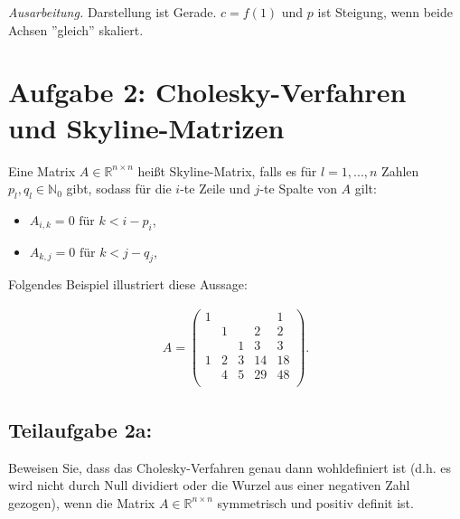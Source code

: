 \documentclass[]{article}
\newenvironment{ausarbeitung}{\vspace{3mm}\noindent\textit{Ausarbeitung.}}{}
\begin{document}
\begin{ausarbeitung}
	Darstellung ist Gerade. $c = f(1)$ und $p$ ist Steigung, wenn beide Achsen ''gleich'' skaliert.
\end{ausarbeitung}
\newpage



\section*{Aufgabe 2: Cholesky-Verfahren und Skyline-Matrizen}
Eine Matrix $A \in \mathbb{R}^{n\times n}$ heißt Skyline-Matrix, falls es für $l = 1, ..., n$ Zahlen $p_l, q_l \in \mathbb{N}_0$ gibt, sodass für die $i$-te Zeile und $j$-te Spalte von $A$ gilt:

\begin{itemize}
	\item $A_{i,k} = 0 \text{ für } k < i - p_i$,
	\item $A_{k,j} = 0 \text{ für } k < j - q_j$,
\end{itemize}

Folgendes Beispiel illustriert diese Aussage:

\begin{align*}
	A = \begin{pmatrix}
		1 &   &   &   & 1 \\
		  & 1 &   & 2 & 2 \\
		  &   & 1 & 3 & 3 \\
		1 & 2 & 3 &14 &18 \\
		  & 4 & 5 &29 &48 \\
	\end{pmatrix}.
\end{align*}


\subsection*{Teilaufgabe 2a:}
Beweisen Sie, dass das Cholesky-Verfahren genau dann wohldefiniert ist (d.h. es wird nicht durch Null dividiert oder die Wurzel aus einer negativen Zahl gezogen), wenn die Matrix $A \in \mathbb{R}^{n\times n}$ symmetrisch und positiv definit ist.
\end{document}
